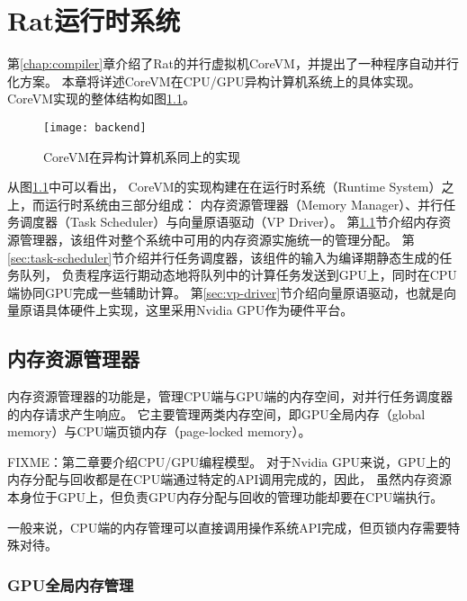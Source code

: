 \chapter{Rat运行时系统}

第\ref{chap:compiler}章介绍了Rat的并行虚拟机CoreVM，并提出了一种程序自动并行化方案。
本章将详述CoreVM在CPU/GPU异构计算机系统上的具体实现。
CoreVM实现的整体结构如图\ref{fig:backend}。
\begin{figure}
  \centering
  \texttt{[image: backend]}
  \caption{CoreVM在异构计算机系同上的实现}
  \label{fig:backend}
\end{figure}

从图\ref{fig:backend}中可以看出，
CoreVM的实现构建在在运行时系统（Runtime System）之上，而运行时系统由三部分组成：
内存资源管理器（Memory Manager）、并行任务调度器（Task Scheduler）与向量原语驱动（VP Driver）。
第\ref{sec:memory-manager}节介绍内存资源管理器，该组件对整个系统中可用的内存资源实施统一的管理分配。
第\ref{sec:task-scheduler}节介绍并行任务调度器，该组件的输入为编译期静态生成的任务队列，
负责程序运行期动态地将队列中的计算任务发送到GPU上，同时在CPU端协同GPU完成一些辅助计算。
第\ref{sec:vp-driver}节介绍向量原语驱动，也就是向量原语具体硬件上实现，这里采用Nvidia GPU作为硬件平台。

\section{内存资源管理器}\label{sec:memory-manager}
内存资源管理器的功能是，管理CPU端与GPU端的内存空间，对并行任务调度器的内存请求产生响应。
它主要管理两类内存空间，即GPU全局内存（global memory）与CPU端页锁内存（page-locked memory）。

FIXME：第二章要介绍CPU/GPU编程模型。
对于Nvidia GPU来说，GPU上的内存分配与回收都是在CPU端通过特定的API调用完成的，因此，
虽然内存资源本身位于GPU上，但负责GPU内存分配与回收的管理功能却要在CPU端执行。

一般来说，CPU端的内存管理可以直接调用操作系统API完成，但页锁内存需要特殊对待。

\subsection{GPU全局内存管理}

